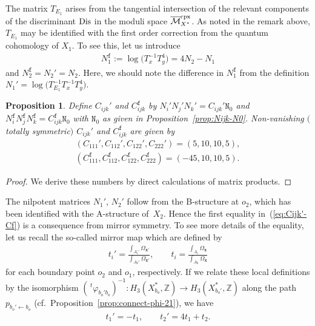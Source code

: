 \documentclass[10pt,a4paper]{amsart}
\numberwithin{equation}{section}
\newtheorem{Proposition}[Theorem]{Proposition}
\begin{document}
The matrix $T_{E_{1}}$ arises from the tangential intersection of the relevant components of the discriminant ${\rm Dis}$ in the moduli space $\overline{\mathcal{M}}_{X^{*}}^{\rm cpx}$. As noted in the remark above, $T_{E_{1}}$ may be identified with the first order correction from the quantum cohomology of $X_{1}$. To see this, let us introduce
\begin{gather}
N_{1}^{\mathtt{f}}:=\log\big(T_{x}^{-1}T_{y}^{4}\big)=4N_{2}-N_{1}\label{eq:N-Nf}
\end{gather}
and $N_{2}^{\mathtt{f}}=N_{2}'=N_{2}$. Here, we should note the difference in $N_{1}^{\mathtt{f}}$ from the definition $N_{1}'=\log\big(T_{E_{1}}^{-1}T_{x}^{-1}T_{y}^{4}\big)$.
\begin{Proposition}\label{prop: Cijk'-Cf-prop}Define $C_{ijk}'$ and $C_{ijk}^{\mathtt{f}}$ by $N_{i}'N_{j}'N_{k}'=C_{ijk}'\mathtt{N}_{0}$ and $N_{i}^{\mathtt{f}}N_{j}^{\mathtt{f}}N_{k}^{\mathtt{f}}=C_{ijk}^{\mathtt{f}}\mathtt{N}_{0}$ with $\mathtt{N}_{0}$ as given in Proposition~{\rm \ref{prop:Nijk-N0}}. Non-vanishing $($totally symmetric$)$ $C_{ijk}'$ and $C_{ijk}^{\mathtt{f}}$
are given by
\begin{gather}
(C_{111}',C_{112}',C_{122}',C_{222}')=(5,10,10,5),\nonumber\\
(C_{111}^{\mathtt{f}},C_{112}^{\mathtt{f}},C_{122}^{\mathtt{f}},C_{222}^{\mathtt{f}})=(-45,10,10,5).\label{eq:Cijk'-Cf}
\end{gather}
\end{Proposition}
\begin{proof}We derive these numbers by direct calculations of matrix products.
\end{proof}

The nilpotent matrices $N_{1}'$, $N_{2}'$ follow from the B-structure at $o_{2}$, which has been identified with the A-structure of~$X_{2}$. Hence the first equality in~(\ref{eq:Cijk'-Cf}) is a consequence from mirror symmetry. To see more details of the equality, let us recall the so-called mirror map which are defined by
\begin{gather}
t_{i}'=\frac{\int_{A_{i}'}\Omega_{\bm{x}'}}{\int_{A_{0}'}\Omega_{\bm{x}'}},\qquad t_{i}=\frac{\int_{A_{i}}\Omega_{\bm{x}}}{\int_{A_{0}}\Omega_{\bm{x}}}\label{eq:mirror-map}
\end{gather}
for each boundary point $o_{2}$ and $o_{1}$, respectively. If we relate these local definitions by the isomorphism $(\,^{t}\varphi_{b_{o}'b_{o}})^{-1}\colon H_{3}(X_{b_{o}}^{*},\mathbb{Z})\to H_{3}(X_{b_{o}'}^{*},\mathbb{Z})$ along the path $p_{b_{o}'\leftarrow b_{o}}$ (cf.\ Proposition~\ref{prop:connect-phi-21}), we have
\begin{gather*}
t_{1}'=-t_{1},\qquad t_{2}'=4t_{1}+t_{2}.
\end{gather*}
\end{document}
